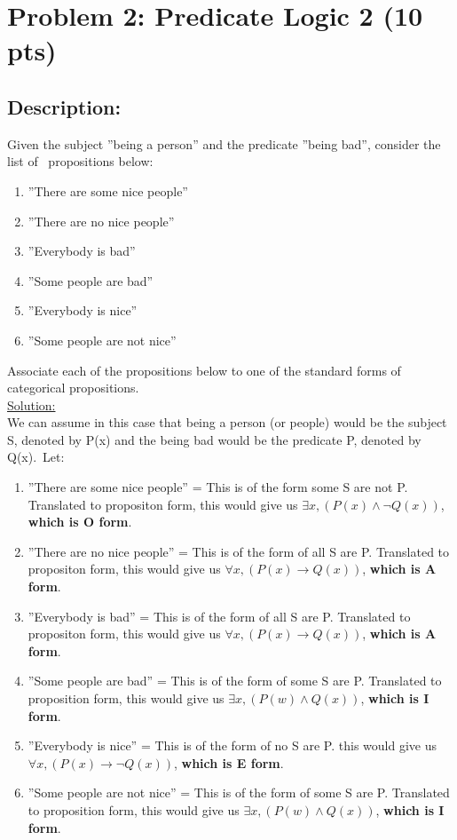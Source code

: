 \section{Problem 2: Predicate Logic 2 (10 pts)}

\subsection{Description:}

\noindent Given the subject {''being a person''} and the predicate {''being bad''}, consider the list of \ propositions below:
\begin{enumerate}
  \item {''There are some nice people''}
  \item {''There are no nice people''}
  \item {''Everybody is bad''}
  \item {''Some people are bad''}
  \item {''Everybody is nice''}
  \item {''Some people are not nice''}
  
\end{enumerate}

\noindent Associate each of the propositions below to one of the standard forms of categorical propositions.\\

\noindent \underline{Solution:}\\
We can assume in this case that being a person (or people) would be the subject S, denoted by P(x) and the being bad would be the predicate P, denoted by Q(x).\
Let:\

\begin{enumerate}
  \item {''There are some nice people''} = This is of the form some S are not P. Translated to propositon form, this would give us $\exists x, (P(x) \wedge \neg Q(x))$, \textbf{which is O form}. 
  \item {''There are no nice people''} = This is of the form of all S are P. Translated to propositon form, this would give us $\forall x, (P(x) \to Q(x))$, \textbf{which is A form}.
  \item {''Everybody is bad''} = This is of the form of all S are P. Translated to propositon form, this would give us $\forall x, (P(x) \to Q(x))$, \textbf{which is A form}.
  \item {''Some people are bad''} = This is of the form of some S are P. Translated to proposition form, this would give us $\exists x, (P(w) \wedge Q(x))$, \textbf{which is I form}.
  \item {''Everybody is nice''} = This is of the form of no S are P. this would give us $\forall x, (P(x) \to \neg Q(x))$, \textbf{which is E form}.
  \item {''Some people are not nice''} = This is of the form of some S are P. Translated to proposition form, this would give us $\exists x, (P(w) \wedge Q(x))$, \textbf{which is I form}.
\end{enumerate}

